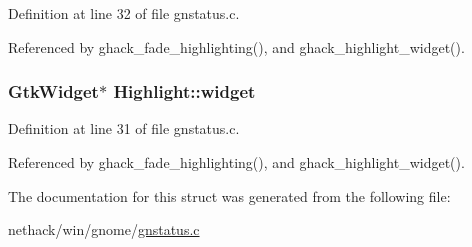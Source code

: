 Definition at line 32 of file gnstatus.\+c.



Referenced by ghack\+\_\+fade\+\_\+highlighting(), and ghack\+\_\+highlight\+\_\+widget().

\hypertarget{structHighlight_a714326111ec667490ab456181396aff6}{
\subsubsection[{widget}]{\setlength{\rightskip}{0pt plus 5cm}Gtk\+Widget$\ast$ Highlight\+::widget}}\label{structHighlight_a714326111ec667490ab456181396aff6}


Definition at line 31 of file gnstatus.\+c.



Referenced by ghack\+\_\+fade\+\_\+highlighting(), and ghack\+\_\+highlight\+\_\+widget().



The documentation for this struct was generated from the following file\+:\begin{DoxyCompactItemize}
\item 
nethack/win/gnome/\hyperlink{gnstatus_8c}{gnstatus.\+c}\end{DoxyCompactItemize}
